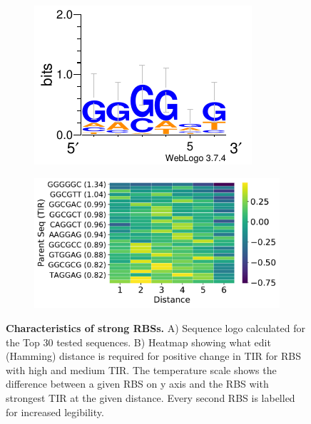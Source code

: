 \documentclass{article}
\begin{document}
\begin{figure}[!t]
     \centering
     \begin{subfigure}[b]{0.49\textwidth}
         \centering
         \caption{}
         \includegraphics[scale=1.2]{plots/Main_Paper/TOP30_logo.pdf}
     \end{subfigure}
     \hfill
     \begin{subfigure}[b]{0.49\textwidth}
         \centering
         \caption{}
         \includegraphics[scale=0.43]{plots/Main_Paper/heatmap.pdf}
     \end{subfigure}
     \caption{\textbf{Characteristics of strong RBSs.} A) Sequence logo calculated for the Top 30 tested sequences. B) Heatmap showing what edit (Hamming) distance is required for positive change in TIR for RBS with high and medium TIR. The temperature scale shows the difference between a given RBS on y axis and the RBS with strongest TIR at the given distance. Every second RBS is labelled for increased legibility. }
     \label{fig:Library characteristics}
\end{figure}
\end{document}
